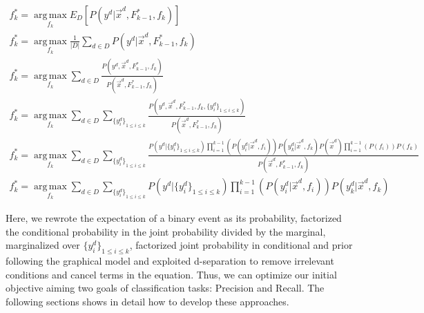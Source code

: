 \documentclass{article}
\begin{document}
\begin{gather}
f_{k}^* = \operatorname*{arg\,max}_{f_k} E_D[P\left(y^d | \vec{x}^d,F_{k-1}^{*},f_k\right)]\\
f_{k}^* = \operatorname*{arg\,max}_{f_k} \frac{1}{|D|} \sum_{d \in D} P(y^d | \vec{x}^d,F_{k-1}^{*},f_k)\\
f_{k}^* = \operatorname*{arg\,max}_{f_k} \sum_{d \in D} \frac{P(y^d, \vec{x}^d, F_{k-1}^{*},f_k)}{P(\vec{x}^d, F_{k-1}^{*},f_k)}\\
f_{k}^* = \operatorname*{arg\,max}_{f_k} \sum_{d \in D} \sum_{{\{y_{i}^d\}}_{1\leq i \leq k}} \frac{P(y^d, \vec{x}^d, F_{k-1}^{*},f_k,\{y_{i}^d\}_{1\leq i \leq k})}{P(\vec{x}^d, F_{k-1}^{*},f_k)}\\
f_{k}^* = \operatorname*{arg\,max}_{f_k} \sum_{d \in D} \sum_{{\{y_{i}^d\}}_{1\leq i \leq k}} \frac{P(y^d| \{y^d_i\}_{1 \leq i \leq k}) \prod_{i=1}^{k-1}\left(P(y_i^d |\vec{x}^d, f_i)\right)P(y_k^d |\vec{x}^d, f_k) P(\vec{x}^d) \prod_{i=1}^{k-1}\left(P(f_i)\right) P(f_k)}{P(\vec{x}^d, F_{k-1}^{*},f_k)}\\
f_{k}^* = \operatorname*{arg\,max}_{f_k} \sum_{d \in D} \sum_{{\{y_{i}^d\}}_{1\leq i \leq k}} P(y^d| \{y^d_i\}_{1 \leq i \leq k}) \prod_{i=1}^{k-1}\left(P(y_i^d |\vec{x}^d, f_i)\right)P(y_k^d |\vec{x}^d, f_k)\label{eq:generalderivation}
\end{gather}

Here, we rewrote the expectation of a binary event as its probability, factorized the conditional probability in the joint probability divided by the marginal, marginalized over $\{y^d_i\}_{1 \leq i \leq k}$, factorized joint probability in conditional and prior following the graphical model and exploited d-separation to remove irrelevant conditions and cancel terms in the equation. Thus, we can optimize our initial objective aiming two goals of classification tasks: Precision and Recall. The following sections shows in detail how to develop these approaches.
\end{document}
